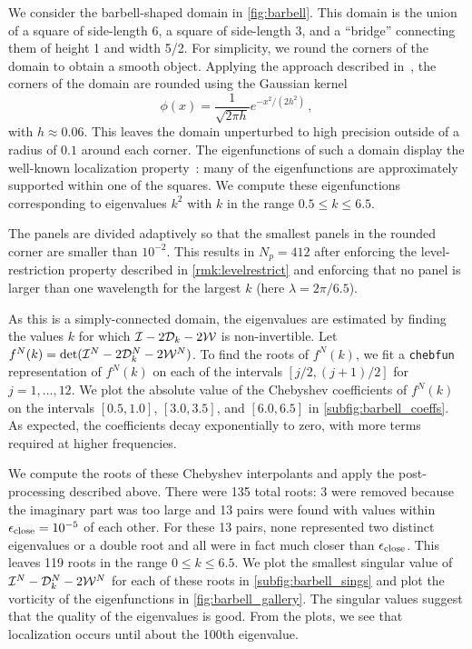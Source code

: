 We consider the barbell-shaped domain in \cref{fig:barbell}.
This domain is the union of a square of side-length 6,
a square of side-length 3, and a ``bridge'' connecting
them of height 1 and width 5/2.
%
For simplicity, we round the corners of the domain
to obtain a smooth object.
%
Applying the approach described in~\cite{epstein2016smoothed},
the corners of the domain are rounded using the Gaussian kernel
\begin{equation}
  \nonumber
\phi(x) = \frac{1}{\sqrt{2\pi h}} e^{-x^2/(2 h^2)} \, ,
\end{equation}
with $h\approx 0.06$. This leaves the domain unperturbed
to high precision outside of a radius of $0.1$ around
each corner.
%
The eigenfunctions of such a domain display the well-known
localization property~\cite{trefethen2006computed}:
many of the eigenfunctions are approximately supported
within one of the squares.
%
We compute these eigenfunctions corresponding to
eigenvalues $k^2$ with $k$ in the range
$0.5 \leq k \leq 6.5$.

%
The panels are divided adaptively so that the smallest
panels in the rounded corner are smaller than $10^{-2}$.
%
This results in $N_p = 412$ after enforcing the
level-restriction property described in
\cref{rmk:levelrestrict}
and enforcing that no panel is larger than
one wavelength for the largest $k$
(here $\lambda=2\pi/6.5$).

As this is a simply-connected domain,
the eigenvalues are estimated by finding the values
$k$ for which $\mathcal I-2{\mathcal D}_{k}-2{\mathcal W}$ is non-invertible.
%
Let $f^N(k) = \det (\mathcal I^N-2{\mathcal D}_{k}^N-2{\mathcal W}^N)$.
To find the roots of $f^N(k)$, we fit a \texttt{chebfun}
representation of $f^N(k)$ on each of the intervals
$[j/2,(j+1)/2]$ for $j = 1,\ldots,12$.
%
We plot the absolute value of the Chebyshev coefficients
of $f^N(k)$ on the intervals $[0.5,1.0]$, $[3.0,3.5]$,
and $[6.0,6.5]$ in \cref{subfig:barbell_coeffs}.
%
As expected, the coefficients decay exponentially
to zero, with more terms required at higher
frequencies.
%

We compute the roots of these Chebyshev interpolants
and apply the post-processing described above.
%
There were 135 total roots: 3 were removed because
the imaginary part was too large and 13 pairs were found
with values within ${\epsilon_{\textrm{close}}} = 10^{-5}$ of each other.
%
For these 13 pairs, none represented two distinct
eigenvalues or a double root and all were in fact
much closer than ${\epsilon_{\textrm{close}}}$.
%
This leaves 119 roots in the range $0\leq k \leq 6.5$.
%
We plot the smallest singular value of
$\mathcal I^N-{\mathcal D}_{k}^N-2{\mathcal W}^N$ for each of these roots in
\cref{subfig:barbell_sings}
and plot the vorticity of the eigenfunctions
in \cref{fig:barbell_gallery}.
%
The singular values suggest that the quality of the
eigenvalues is good.
From the plots, we see that localization occurs
until about the 100th eigenvalue.


